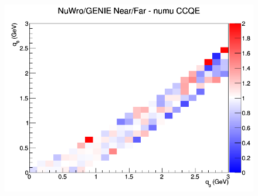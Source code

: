 \begin{figure}[h]
\endminipage
{}
\includegraphics[width=\linewidth]{q0_q3/nominal/ratios/CCQE_NuWro_GENIE_numu_NF_q3_q0.png}
\endminipage
\newline
\end{figure}
\clearpage
